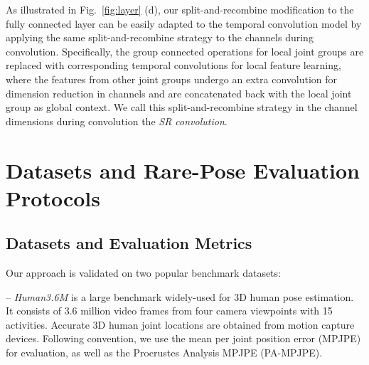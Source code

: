 \documentclass[runningheads]{llncs}
\begin{document}
As illustrated in Fig.~\ref{fig:layer} (d), our split-and-recombine modification to the fully connected layer can be easily adapted to the temporal convolution model by applying the same split-and-recombine strategy to the channels during convolution. 
Specifically, the group connected operations for local joint groups are replaced with corresponding temporal convolutions for local feature learning, where the features from other joint groups undergo an extra convolution for dimension reduction in channels and are concatenated back with the local joint group as global context.
We call this split-and-recombine strategy in the channel dimensions during convolution the \emph{SR convolution}.















































\section{Datasets and Rare-Pose Evaluation Protocols}
\label{sec:data}
\subsection{Datasets and Evaluation Metrics}
Our approach is validated on two popular benchmark datasets:

\noindent -- \emph{Human3.6M} \cite{h36m_pami} is a large benchmark widely-used for 3D human pose estimation. It consists of 3.6 million video frames from four camera viewpoints with 15 activities. Accurate 3D human joint locations are obtained from motion capture devices. Following convention, we use the mean per joint position error (MPJPE) for evaluation, as well as the Procrustes Analysis MPJPE (PA-MPJPE).
\end{document}
